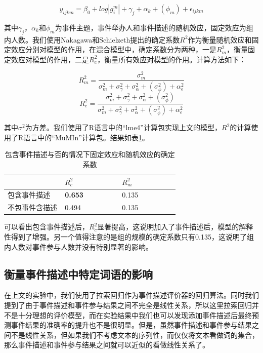 \documentclass[12pt]{template}
\begin{document}
\begin{equation}
y_{ijkm}=\beta_0+log|g_i^m|+\gamma_j+\alpha_k+ (\phi_m) +\epsilon_{ijkm}
\end{equation}

其中\(\gamma_j\)，\(\alpha_k\)和\(\phi_m\)为事件主题，事件举办人和事件描述的随机效应，固定效应为组内人数。我们使用Nakagawa和Schielzeth\citep{nakagawa_ageneralandsimplemethodforobtaining_2013}提出的确定系数\(R^2\)作为衡量随机效应和固定效应分别对模型的作用，在混合模型中，确定系数分为两种，一是\(R_m^2\)，衡量固定效应对模型的作用，二是\(R_c^2\)，衡量所有效应对模型的作用。计算方法如下：

\begin{equation}
R_m^2=\frac{\sigma_m^2}{\sigma_m^2+\sigma_\gamma^2+\sigma_\alpha^2+(\sigma_\phi^2)+\alpha_\epsilon^2}
\end{equation}
\begin{equation}
R_c^2=\frac{\sigma_m^2+\sigma_\gamma^2+\sigma_\alpha^2+(\sigma_\phi^2)}{\sigma_m^2+\sigma_\gamma^2+\sigma_\alpha^2+(\sigma_\phi^2)+\alpha_\epsilon^2}
\end{equation}

其中\(\sigma^2\)为方差。我们使用了R语言中的``lme4''计算包\citep{lme4}实现上文的模型，\(R^2\)的计算使用了R语言中的``MuMIn''计算包\citep{MuMIn}。结果如表\ref{t1-4}。

\begin{table}[htbp]
  \caption{\label{t1-4}包含事件描述与否的情况下固定效应和随机效应的确定系数}
	\centering  
    \begin{tabular*}{\linewidth}{p{0.33\linewidth}p{0.33\linewidth}p{0.33\linewidth}}
  \toprule
    &  \(R_c^2\) & \(R_m^2\) \\ 
  \midrule
		包含事件描述                       & \textbf{0.653} & 0.135 \\ 
    不包事件含描述                        & 0.494 & 0.135 \\ 
  \bottomrule
    \end{tabular*}
\end{table}

可以看出包含事件描述后，\(R_c^2\)显著提高，这说明加入了事件描述后，模型的解释性得到了增强。另一个值得注意的是组的规模的确定系数只有0.135，这说明了组内人数对事件参与人数并没有特别显著的影响。

\subsection{衡量事件描述中特定词语的影响}
在上文的实验中，我们使用了拉索回归作为事件描述评价器的回归算法。同时我们提到了由于事件描述和事件参与结果之间不完全是线性关系，所以这里拉索回归并不是十分理想的评价模型，而在实验结果中我们也可以发现添加事件描述后最终预测事件结果的准确率的提升也不是很明显。但是，虽然事件描述和事件参与结果之间不是线性关系，但如果我们不考虑文本的序列性，而仅仅将文本看做词的集合，那么事件描述和事件参与结果之间就可以近似的看做线性关系了。
\end{document}
